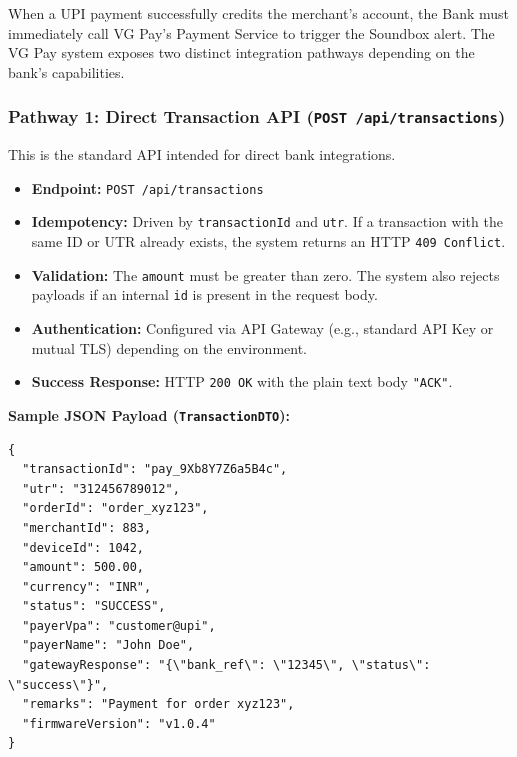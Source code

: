 \documentclass[11pt,a4paper]{article}
\begin{document}
When a UPI payment successfully credits the merchant's account, the Bank must immediately call VG Pay's Payment Service to trigger the Soundbox alert. The VG Pay system exposes two distinct integration pathways depending on the bank's capabilities.

\subsubsection{Pathway 1: Direct Transaction API (\texttt{POST /api/transactions})}
This is the standard API intended for direct bank integrations.
\begin{itemize}
    \item \textbf{Endpoint:} \texttt{POST /api/transactions}
    \item \textbf{Idempotency:} Driven by \texttt{transactionId} and \texttt{utr}. If a transaction with the same ID or UTR already exists, the system returns an HTTP \texttt{409 Conflict}.
    \item \textbf{Validation:} The \texttt{amount} must be greater than zero. The system also rejects payloads if an internal \texttt{id} is present in the request body.
    \item \textbf{Authentication:} Configured via API Gateway (e.g., standard API Key or mutual TLS) depending on the environment.
    \item \textbf{Success Response:} HTTP \texttt{200 OK} with the plain text body \texttt{"ACK"}.
\end{itemize}

\textbf{Sample JSON Payload (\texttt{TransactionDTO}):}
\begin{lstlisting}
{
  "transactionId": "pay_9Xb8Y7Z6a5B4c",
  "utr": "312456789012",
  "orderId": "order_xyz123",
  "merchantId": 883,
  "deviceId": 1042,
  "amount": 500.00,
  "currency": "INR",
  "status": "SUCCESS",
  "payerVpa": "customer@upi",
  "payerName": "John Doe",
  "gatewayResponse": "{\"bank_ref\": \"12345\", \"status\": \"success\"}",
  "remarks": "Payment for order xyz123",
  "firmwareVersion": "v1.0.4"
}
\end{lstlisting}
\end{document}

